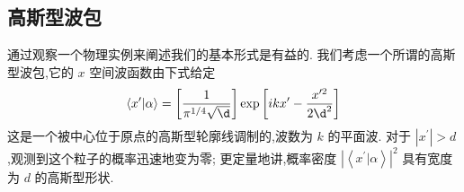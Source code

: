 \documentclass[lang=cn,newtx,10pt,scheme=chinese,thmcnt=section]{elegantbook}
\begin{document}
\subsection*{高斯型波包}
通过观察一个物理实例来阐述我们的基本形式是有益的. 我们考虑一个所谓的高斯型波包,它的 $x$ 空间波函数由下式给定
\begin{equation}
	\left\langle {{x}^{\prime } | \alpha }\right\rangle = \left\lbrack \frac{1}{{\pi }^{1/4}\sqrt{\d}}\right\rbrack \exp \left\lbrack {{ik}{x}^{\prime } - \frac{{x}^{\prime 2}}{2{\d}^{2}}}\right\rbrack
\end{equation}
这是一个被中心位于原点的高斯型轮廓线调制的,波数为 $k$ 的平面波. 对于 $\left| {x}^{\prime }\right| > d$ ,观测到这个粒子的概率迅速地变为零; 更定量地讲,概率密度 ${\left| \left\langle {x}^{\prime } | \alpha \right\rangle \right| }^{2}$ 具有宽度为 $d$ 的高斯型形状.
\end{document}
